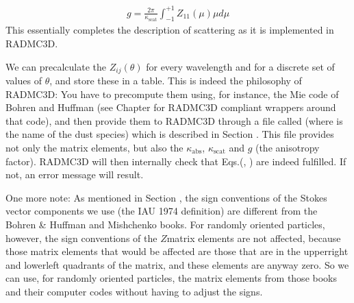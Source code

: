 \documentclass[letterpaper,10pt,english]{sphinxmanual}
\begin{document}
\label{\detokenize{dustradtrans:eq-scatmat-selfconsist-g}}\begin{equation*}
\begin{split}g = \frac{2\pi}{\kappa_{\mathrm{scat}}}\int_{-1}^{+1}Z_{11}(\mu)\mu d\mu\end{split}
\end{equation*}
This essentially completes the description of scattering as it is implemented in
RADMC\sphinxhyphen{}3D.

We can precalculate the \(Z_{ij}(\theta)\) for every wavelength and for a
discrete set of values of \(\theta\), and store these in a table. This is
indeed the philosophy of RADMC\sphinxhyphen{}3D: You have to precompute them using, for
instance, the Mie code of Bohren and Huffman (see Chapter
{\hyperref[\detokenize{opacitieswww:chap-acquiring-opacities}]{}} for RADMC\sphinxhyphen{}3D compliant wrappers around that
code), and then provide them to RADMC\sphinxhyphen{}3D through a file called
 (where  is the name of the dust species) which
is described in Section {\hyperref[\detokenize{inputoutputfiles:sec-dustkapscatmat-files}]{}}.  This file provides not
only the matrix elements, but also the \(\kappa_{\mathrm{abs}}\),
\(\kappa_{\mathrm{scat}}\) and \(g\) (the anisotropy factor). RADMC\sphinxhyphen{}3D
will then internally check that Eqs.(,
) are indeed fulfilled. If not, an error message
will result.

One more note: As mentioned in Section {\hyperref[\detokenize{dustradtrans:sec-definitions-stokes}]{}}, the sign
conventions of the Stokes vector components we use (the IAU 1974 definition) are
different from the Bohren \& Huffman and Mishchenko books. For randomly oriented
particles, however, the sign conventions of the \(Z\)\sphinxhyphen{}matrix elements are
not affected, because those matrix elements that would be affected are those
that are in the upper\sphinxhyphen{}right and lower\sphinxhyphen{}left quadrants of the matrix, and these
elements are anyway zero. So we can use, for randomly oriented particles, the
matrix elements from those books and their computer codes without having to
adjust the signs.
\end{document}
